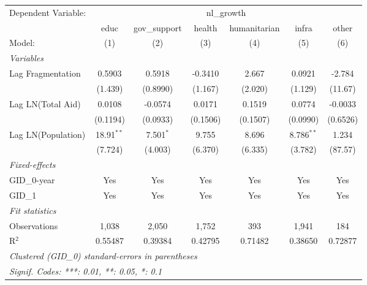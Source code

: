 \begingroup
\centering
\begin{tabular}{lcccccc}
   \tabularnewline \midrule \midrule
   Dependent Variable: & \multicolumn{6}{c}{nl\_growth}\\
                      & educ         & gov\_support  & health   & humanitarian & infra        & other \\   
   Model:             & (1)          & (2)           & (3)      & (4)          & (5)          & (6)\\  
   \midrule
   \emph{Variables}\\
   Lag Fragmentation  & 0.5903       & 0.5918        & -0.3410  & 2.667        & 0.0921       & -2.784\\   
                      & (1.439)      & (0.8990)      & (1.167)  & (2.020)      & (1.129)      & (11.67)\\   
   Lag LN(Total Aid)  & 0.0108       & -0.0574       & 0.0171   & 0.1519       & 0.0774       & -0.0033\\   
                      & (0.1194)     & (0.0933)      & (0.1506) & (0.1507)     & (0.0990)     & (0.6526)\\   
   Lag LN(Population) & 18.91$^{**}$ & 7.501$^{*}$   & 9.755    & 8.696        & 8.786$^{**}$ & 1.234\\   
                      & (7.724)      & (4.003)       & (6.370)  & (6.335)      & (3.782)      & (87.57)\\   
   \midrule
   \emph{Fixed-effects}\\
   GID\_0-year        & Yes          & Yes           & Yes      & Yes          & Yes          & Yes\\  
   GID\_1             & Yes          & Yes           & Yes      & Yes          & Yes          & Yes\\  
   \midrule
   \emph{Fit statistics}\\
   Observations       & 1,038        & 2,050         & 1,752    & 393          & 1,941        & 184\\  
   R$^2$              & 0.55487      & 0.39384       & 0.42795  & 0.71482      & 0.38650      & 0.72877\\  
   \midrule \midrule
   \multicolumn{7}{l}{\emph{Clustered (GID\_0) standard-errors in parentheses}}\\
   \multicolumn{7}{l}{\emph{Signif. Codes: ***: 0.01, **: 0.05, *: 0.1}}\\
\end{tabular}
\par\endgroup




